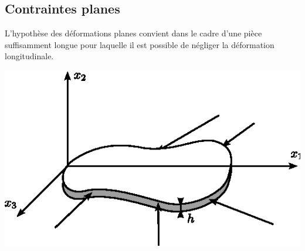 \subsection{Contraintes planes}\label{ssec:Ch08-1.2}
L'hypothèse des déformations planes convient dans le cadre d'une pièce suffisamment longue pour laquelle il est possible de négliger la déformation longitudinale. 

\begin{center}
    \includegraphics{../images/T1_Ch08-01}
\end{center}

